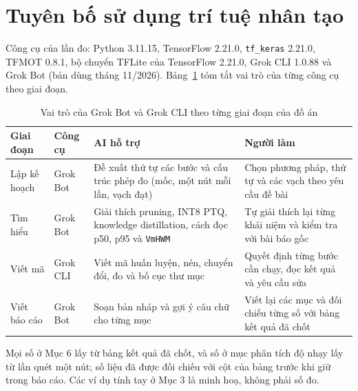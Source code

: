\documentclass[13pt,a4paper]{article}
\begin{document}
\section{Tuyên bố sử dụng trí tuệ nhân tạo}


Công cụ của lần đo: Python 3.11.15, TensorFlow 2.21.0, \texttt{tf\_keras} 2.21.0, TFMOT 0.8.1, bộ chuyển TFLite của TensorFlow 2.21.0, Grok CLI 1.0.88 và Grok Bot (bản dùng tháng 11/2026). Bảng~\ref{tab:ai_use} tóm tắt vai trò của từng công cụ theo giai đoạn.

\begin{table}[h]
\centering
\caption{Vai trò của Grok Bot và Grok CLI theo từng giai đoạn của đồ án}
\label{tab:ai_use}
\begin{tabular}{|p{2.6cm}|p{2cm}|p{4.6cm}|p{4.6cm}|}
\hline
\textbf{Giai đoạn} & \textbf{Công cụ} & \textbf{AI hỗ trợ} & \textbf{Người làm} \\
\hline
Lập kế hoạch & Grok Bot & Đề xuất thứ tự các bước và cấu trúc phép đo (mốc, một nút mỗi lần, vạch đạt) & Chọn phương pháp, thứ tự và các vạch theo yêu cầu đề bài \\
\hline
Tìm hiểu & Grok Bot & Giải thích pruning, INT8 PTQ, knowledge distillation, cách đọc p50, p95 và \texttt{VmHWM} & Tự giải thích lại từng khái niệm và kiểm tra với bài báo gốc \\
\hline
Viết mã & Grok CLI & Viết mã huấn luyện, nén, chuyển đổi, đo và bố cục thư mục & Quyết định từng bước cần chạy, đọc kết quả và yêu cầu sửa \\
\hline
Viết báo cáo & Grok Bot & Soạn bản nháp và gợi ý câu chữ cho từng mục & Viết lại các mục và đối chiếu từng số với bảng kết quả đã chốt \\
\hline
\end{tabular}
\end{table}

Mọi số ở Mục 6 lấy từ bảng kết quả đã chốt, và số ở mục phân tích độ nhạy lấy từ lần quét một nút; số liệu đã được đối chiếu với cột của bảng trước khi giữ trong báo cáo. Các ví dụ tính tay ở Mục 3 là minh hoạ, không phải số đo.
\end{document}
